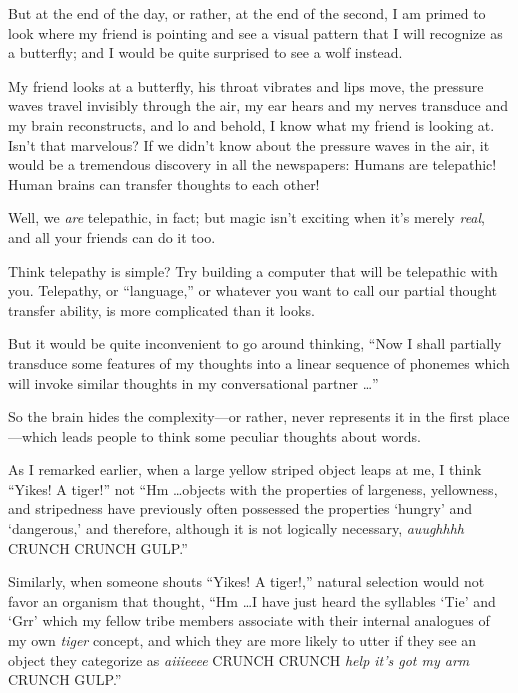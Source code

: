 {
 But at the end of the day, or rather, at the end of the second, I
am primed to look where my friend is pointing and see a visual pattern
that I will recognize as a butterfly; and I would be quite surprised to
see a wolf instead.}

{
 My friend looks at a butterfly, his throat vibrates and lips move,
the pressure waves travel invisibly through the air, my ear hears and
my nerves transduce and my brain reconstructs, and lo and behold, I
know what my friend is looking at. Isn't that
marvelous? If we didn't know about the pressure waves
in the air, it would be a tremendous discovery in all the newspapers:
Humans are telepathic! Human brains can transfer thoughts to each
other!}

{
 Well, we \textit{are} telepathic, in fact; but magic
isn't exciting when it's merely
\textit{real}, and all your friends can do it too.}

{
 Think telepathy is simple? Try building a computer that will be
telepathic with you. Telepathy, or
``language,'' or whatever you want
to call our partial thought transfer ability, is more complicated than
it looks.}

{
 But it would be quite inconvenient to go around thinking,
``Now I shall partially transduce some features of my
thoughts into a linear sequence of phonemes which will invoke similar
thoughts in my conversational partner \ldots''}

{
 So the brain hides the complexity---or rather, never represents it
in the first place---which leads people to think some peculiar thoughts
about words.}

{
 As I remarked earlier, when a large yellow striped object leaps at
me, I think ``Yikes! A tiger!'' not
``Hm \ldots objects with the properties of largeness,
yellowness, and stripedness have previously often possessed the
properties `hungry' and
`dangerous,' and therefore, although it
is not logically necessary, \textit{auughhhh} CRUNCH CRUNCH
GULP.''}

{
 Similarly, when someone shouts ``Yikes! A
tiger!,'' natural selection would not favor an
organism that thought, ``Hm \ldots I have just heard
the syllables `Tie' and
`Grr' which my fellow tribe members
associate with their internal analogues of my own \textit{tiger}
concept, and which they are more likely to utter if they see an object
they categorize as \textit{aiiieeee} CRUNCH CRUNCH \textit{help
it's got my arm} CRUNCH GULP.''}

{
 ~}

